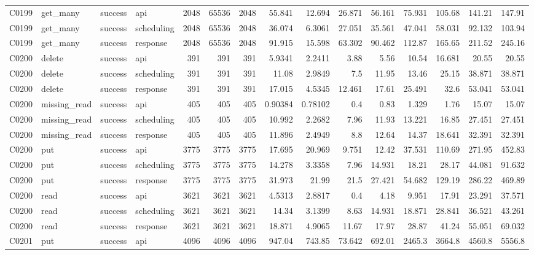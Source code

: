 \begin{landscape}
\begin{longtable}{llllrrrrrrrrrrr}
C0199 & get\_\allowbreak{}many & success & api & 2048 & 65536 & 2048 & 55.841 & 12.694 & 26.871 & 56.161 & 75.931 & 105.68 & 141.21 & 147.91\\
C0199 & get\_\allowbreak{}many & success & scheduling & 2048 & 65536 & 2048 & 36.074 & 6.3061 & 27.051 & 35.561 & 47.041 & 58.031 & 92.132 & 103.94\\
C0199 & get\_\allowbreak{}many & success & response & 2048 & 65536 & 2048 & 91.915 & 15.598 & 63.302 & 90.462 & 112.87 & 165.65 & 211.52 & 245.16\\
C0200 & delete & success & api & 391 & 391 & 391 & 5.9341 & 2.2411 & 3.88 & 5.56 & 10.54 & 16.681 & 20.55 & 20.55\\
C0200 & delete & success & scheduling & 391 & 391 & 391 & 11.08 & 2.9849 & 7.5 & 11.95 & 13.46 & 25.15 & 38.871 & 38.871\\
C0200 & delete & success & response & 391 & 391 & 391 & 17.015 & 4.5345 & 12.461 & 17.61 & 25.491 & 32.6 & 53.041 & 53.041\\
C0200 & missing\_\allowbreak{}read & success & api & 405 & 405 & 405 & 0.90384 & 0.78102 & 0.4 & 0.83 & 1.329 & 1.76 & 15.07 & 15.07\\
C0200 & missing\_\allowbreak{}read & success & scheduling & 405 & 405 & 405 & 10.992 & 2.2682 & 7.96 & 11.93 & 13.221 & 16.85 & 27.451 & 27.451\\
C0200 & missing\_\allowbreak{}read & success & response & 405 & 405 & 405 & 11.896 & 2.4949 & 8.8 & 12.64 & 14.37 & 18.641 & 32.391 & 32.391\\
C0200 & put & success & api & 3775 & 3775 & 3775 & 17.695 & 20.969 & 9.751 & 12.42 & 37.531 & 110.69 & 271.95 & 452.83\\
C0200 & put & success & scheduling & 3775 & 3775 & 3775 & 14.278 & 3.3358 & 7.96 & 14.931 & 18.21 & 28.17 & 44.081 & 91.632\\
C0200 & put & success & response & 3775 & 3775 & 3775 & 31.973 & 21.99 & 21.5 & 27.421 & 54.682 & 129.19 & 286.22 & 469.89\\
C0200 & read & success & api & 3621 & 3621 & 3621 & 4.5313 & 2.8817 & 0.4 & 4.18 & 9.951 & 17.91 & 23.291 & 37.571\\
C0200 & read & success & scheduling & 3621 & 3621 & 3621 & 14.34 & 3.1399 & 8.63 & 14.931 & 18.871 & 28.841 & 36.521 & 43.261\\
C0200 & read & success & response & 3621 & 3621 & 3621 & 18.871 & 4.9065 & 11.67 & 17.97 & 28.87 & 41.24 & 55.051 & 69.032\\
C0201 & put & success & api & 4096 & 4096 & 4096 & 947.04 & 743.85 & 73.642 & 692.01 & 2465.3 & 3664.8 & 4560.8 & 5556.8\\

\end{longtable}
\end{landscape}
